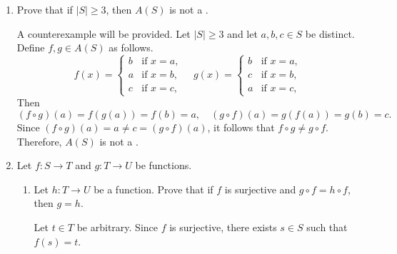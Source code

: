 \begin{enumerate}
\begin{subprove}
\[\begin{pmatrix}
    3 + 0 & 6 + 1
    \end{pmatrix} = \begin{pmatrix}
    1 & 2 \\
    3 & 7
    \end{pmatrix}.
    \]
    Since \(A \cdot B = \begin{pmatrix}
    7 & 4 \\ 
    3 & 1 
    \end{pmatrix}\) is not equal to \(B \cdot A = \begin{pmatrix}
    1 & 2 \\
    3 & 7
    \end{pmatrix}\).
    Therefore, \((G, \cdot)\) does not satisfy the commutative property, and hence it is not a .
  \end{subprove}
  \item Prove that if \(|S| \geq 3\), then \(A(S)\) is not a .
  \begin{subprove}
    A counterexample will be provided. Let \(|S| \geq 3\) and let \(a, b, c \in S\) be distinct.
    Define \(f, g \in A(S)\) as follows.
    \[
      f(x) = \begin{cases}
        b & \text{if } x = a, \\
        a & \text{if } x = b, \\
        c & \text{if } x = c,
      \end{cases}
      \quad
      g(x) = \begin{cases}
        b & \text{if } x = a, \\
        c & \text{if } x = b, \\
        a & \text{if } x = c,
      \end{cases}
    \]
    Then
    \[
      (f \circ g)(a) = f(g(a)) = f(b) = a, \quad
      (g \circ f)(a) = g(f(a)) = g(b) = c.
    \]
    Since \((f \circ g)(a) = a \neq c = (g \circ f)(a)\), it follows that \(f \circ g \neq g \circ f\).
    Therefore, \(A(S)\) is not a .
  \end{subprove}
  \newpage
  \item Let \(f: S \to T\) and \(g: T \to U\) be functions.
  \begin{enumerate}
    \item Let \(h: T \to U\) be a function. Prove that if \(f\) is surjective and \(g \circ f = h \circ f\), then \(g = h\).
    \begin{subprove}
      Let \(t \in T\) be arbitrary.
      Since \(f\) is surjective, there exists \(s \in S\) such that \(f(s) = t\).

\end{subprove}
\end{enumerate}
\end{enumerate}
